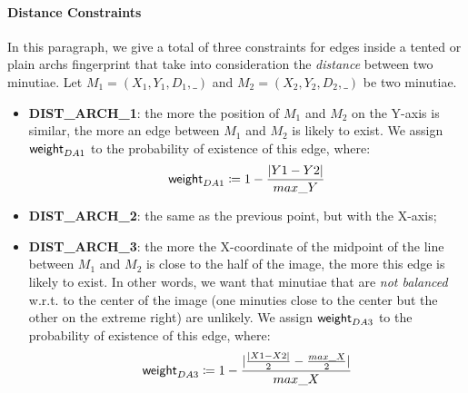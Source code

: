 \documentclass[8pt]{article}
\begin{document}
\paragraph{Distance Constraints}
In this paragraph, we give a total of three constraints for edges inside
a tented or plain archs fingerprint that take into consideration the
\emph{distance} between two minutiae.
Let $M_1=(X_1,Y_1,D_1,\_)$ and $M_2=(X_2,Y_2,D_2,\_)$ be two minutiae.
  \begin{itemize}
    \item \textbf{DIST\_ARCH\_1}: the more the position of $M_1$ and $M_2$
          on the Y-axis is similar, the more an edge between $M_1$ and $M_2$
          is likely to exist. We assign $\textsf{weight}_{DA1}$ to the probability
          of existence of this edge, where:
            \begin{align*}
              \textsf{weight}_{DA1} \coloneqq 1-\frac{\lvert Y1-Y2\rvert}{max\_Y}
            \end{align*}
    \item \textbf{DIST\_ARCH\_2}: the same as the previous point, but with
          the X-axis;
    \item \textbf{DIST\_ARCH\_3}: the more the X-coordinate of the midpoint of 
          the line between $M_1$ and $M_2$ is close to the half of the image,
          the more this edge is likely to exist. In other words, we want that
          minutiae that are \emph{not balanced} w.r.t. to the center of the
          image (\eg one minuties close to the center but the other on the 
          extreme right) are unlikely. We assign $\textsf{weight}_{DA3}$ to the 
          probability of existence of this edge, where:
            \begin{align*}
              \textsf{weight}_{DA3} \coloneqq 1 -
              \frac{\lvert \frac{\lvert X1-X2 \rvert}{2} - \frac{max\_X}{2}
              \rvert}{max\_X}
            \end{align*}
  \end{itemize}
\end{document}
